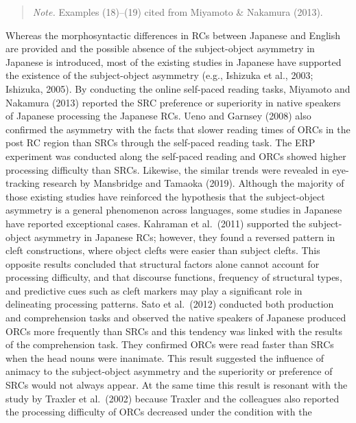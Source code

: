 \documentclass[
]{article}
\begin{document}
\vspace{1em}

\noindent
\begin{quote}
\small
\textit{Note.} Examples (18)--(19) cited from Miyamoto \& Nakamura (2013).
\end{quote}

\vspace{1em}

Whereas the morphosyntactic differences in RCs between Japanese and
English are provided and the possible absence of the subject-object
asymmetry in Japanese is introduced, most of the existing studies in
Japanese have supported the existence of the subject-object asymmetry
(e.g., Ishizuka et al., 2003; Ishizuka, 2005). By conducting the online
self-paced reading tasks, Miyamoto and Nakamura (2013) reported the SRC
preference or superiority in native speakers of Japanese processing the
Japanese RCs. Ueno and Garnsey (2008) also confirmed the asymmetry with
the facts that slower reading times of ORCs in the post RC region than
SRCs through the self-paced reading task. The ERP experiment was
conducted along the self-paced reading and ORCs showed higher processing
difficulty than SRCs. Likewise, the similar trends were revealed in
eye-tracking research by Mansbridge and Tamaoka (2019). Although the
majority of those existing studies have reinforced the hypothesis that
the subject-object asymmetry is a general phenomenon across languages,
some studies in Japanese have reported exceptional cases. Kahraman et
al.~(2011) supported the subject-object asymmetry in Japanese RCs;
however, they found a reversed pattern in cleft constructions, where
object clefts were easier than subject clefts. This opposite results
concluded that structural factors alone cannot account for processing
difficulty, and that discourse functions, frequency of structural types,
and predictive cues such as cleft markers may play a significant role in
delineating processing patterns. Sato et al.~(2012) conducted both
production and comprehension tasks and observed the native speakers of
Japanese produced ORCs more frequently than SRCs and this tendency was
linked with the results of the comprehension task. They confirmed ORCs
were read faster than SRCs when the head nouns were inanimate. This
result suggested the influence of animacy to the subject-object
asymmetry and the superiority or preference of SRCs would not always
appear. At the same time this result is resonant with the study by
Traxler et al.~(2002) because Traxler and the colleagues also reported
the processing difficulty of ORCs decreased under the condition with the
\end{document}
